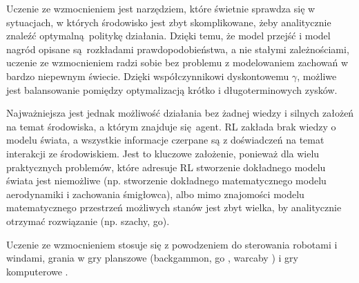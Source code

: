 Uczenie ze wzmocnieniem jest narzędziem, które świetnie sprawdza się w sytuacjach, w których środowisko jest zbyt skomplikowane, żeby analitycznie znaleźć optymalną politykę działania. Dzięki temu, że model przejść i model nagród opisane są rozkładami prawdopodobieństwa, a nie stałymi zależnościami, uczenie ze wzmocnieniem radzi sobie bez problemu z modelowaniem zachowań w bardzo niepewnym świecie. Dzięki współczynnikowi dyskontowemu $\gamma$, możliwe jest balansowanie pomiędzy optymalizacją krótko i długoterminowych zysków.

Najważniejsza jest jednak możliwość działania bez żadnej wiedzy i silnych założeń na temat środowiska, a którym znajduje się agent. RL zakłada brak wiedzy o modelu świata, a wszystkie informacje czerpane są z doświadczeń na temat interakcji ze środowiskiem. Jest to kluczowe założenie, ponieważ dla wielu praktycznych problemów, które adresuje RL stworzenie dokładnego modelu świata jest niemożliwe (np. stworzenie dokładnego matematycznego modelu aerodynamiki i zachowania śmigłowca), albo mimo znajomości modelu matematycznego przestrzeń możliwych stanów jest zbyt wielka, by analitycznie otrzymać rozwiązanie (np. szachy, go).

Uczenie ze wzmocnieniem stosuje się z powodzeniem do sterowania robotami \cite{Mataric94rewardfunctions} i windami\cite{Crites96improvingelevator}, grania w gry planszowe (backgammon\cite{Tesauro1992451}, go \cite{Silver_2016}, warcaby \cite{Samuel:1959:SML:1661923.1661924}) i gry komputerowe \cite{mnih2015human}.



